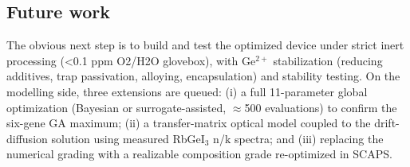 \documentclass[review]{elsarticle}
\begin{document}
\subsection{Future work}
The obvious next step is to build and test the optimized device under strict inert processing (<0.1 ppm O2/H2O glovebox), with Ge$^{2+}$ stabilization (reducing additives, trap passivation, alloying, encapsulation) and stability testing. On the modelling side, three extensions are queued: (i) a full 11-parameter global optimization (Bayesian or surrogate-assisted, $\approx$500 evaluations) to confirm the six-gene GA maximum; (ii) a transfer-matrix optical model coupled to the drift-diffusion solution using measured RbGeI$_{3}$ n/k spectra; and (iii) replacing the numerical grading with a realizable composition grade re-optimized in SCAPS.
\end{document}

